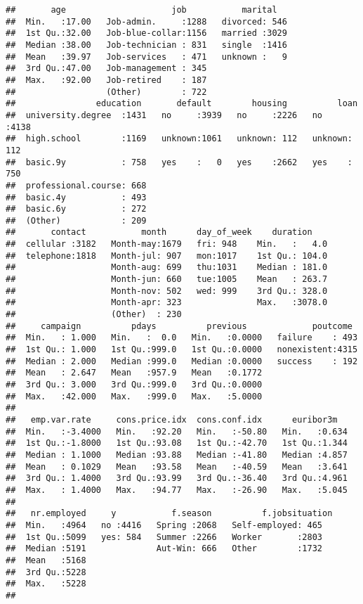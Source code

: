 \documentclass[]{article}
\begin{document}
\begin{verbatim}
##       age                     job           marital    
##  Min.   :17.00   Job-admin.     :1288   divorced: 546  
##  1st Qu.:32.00   Job-blue-collar:1156   married :3029  
##  Median :38.00   Job-technician : 831   single  :1416  
##  Mean   :39.97   Job-services   : 471   unknown :   9  
##  3rd Qu.:47.00   Job-management : 345                  
##  Max.   :92.00   Job-retired    : 187                  
##                  (Other)        : 722                  
##                education       default        housing          loan     
##  university.degree  :1431   no     :3939   no     :2226   no     :4138  
##  high.school        :1169   unknown:1061   unknown: 112   unknown: 112  
##  basic.9y           : 758   yes    :   0   yes    :2662   yes    : 750  
##  professional.course: 668                                               
##  basic.4y           : 493                                               
##  basic.6y           : 272                                               
##  (Other)            : 209                                               
##       contact           month      day_of_week    duration     
##  cellular :3182   Month-may:1679   fri: 948    Min.   :   4.0  
##  telephone:1818   Month-jul: 907   mon:1017    1st Qu.: 104.0  
##                   Month-aug: 699   thu:1031    Median : 181.0  
##                   Month-jun: 660   tue:1005    Mean   : 263.7  
##                   Month-nov: 502   wed: 999    3rd Qu.: 328.0  
##                   Month-apr: 323               Max.   :3078.0  
##                   (Other)  : 230                               
##     campaign          pdays          previous             poutcome   
##  Min.   : 1.000   Min.   :  0.0   Min.   :0.0000   failure    : 493  
##  1st Qu.: 1.000   1st Qu.:999.0   1st Qu.:0.0000   nonexistent:4315  
##  Median : 2.000   Median :999.0   Median :0.0000   success    : 192  
##  Mean   : 2.647   Mean   :957.9   Mean   :0.1772                     
##  3rd Qu.: 3.000   3rd Qu.:999.0   3rd Qu.:0.0000                     
##  Max.   :42.000   Max.   :999.0   Max.   :5.0000                     
##                                                                      
##   emp.var.rate     cons.price.idx  cons.conf.idx      euribor3m    
##  Min.   :-3.4000   Min.   :92.20   Min.   :-50.80   Min.   :0.634  
##  1st Qu.:-1.8000   1st Qu.:93.08   1st Qu.:-42.70   1st Qu.:1.344  
##  Median : 1.1000   Median :93.88   Median :-41.80   Median :4.857  
##  Mean   : 0.1029   Mean   :93.58   Mean   :-40.59   Mean   :3.641  
##  3rd Qu.: 1.4000   3rd Qu.:93.99   3rd Qu.:-36.40   3rd Qu.:4.961  
##  Max.   : 1.4000   Max.   :94.77   Max.   :-26.90   Max.   :5.045  
##                                                                    
##   nr.employed     y           f.season          f.jobsituation
##  Min.   :4964   no :4416   Spring :2068   Self-employed: 465  
##  1st Qu.:5099   yes: 584   Summer :2266   Worker       :2803  
##  Median :5191              Aut-Win: 666   Other        :1732  
##  Mean   :5168                                                 
##  3rd Qu.:5228                                                 
##  Max.   :5228                                                 
## 
\end{verbatim}
\end{document}
